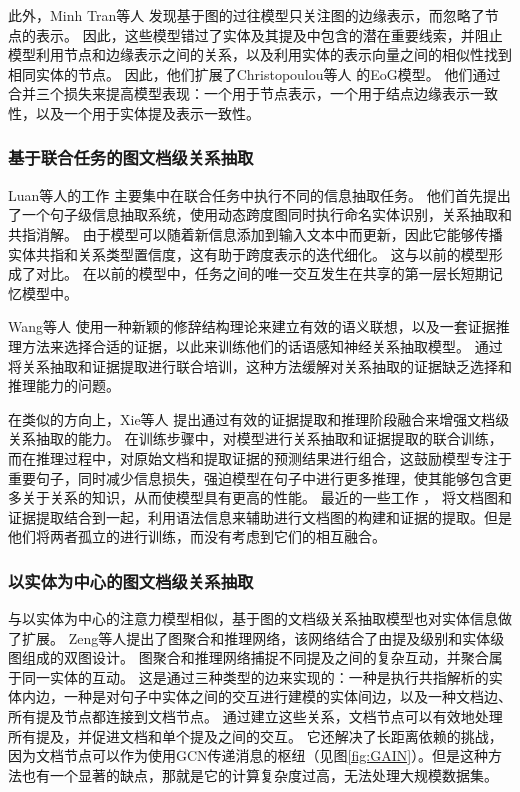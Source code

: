 \documentclass[bachelor]{thesis-uestc}
\begin{document}
此外，Minh Tran等人 \cite{minh-tran-etal-2020-dots}发现基于图的过往模型只关注图的边缘表示，而忽略了节点的表示。
因此，这些模型错过了实体及其提及中包含的潜在重要线索，并阻止模型利用节点和边缘表示之间的关系，以及利用实体的表示向量之间的相似性找到相同实体的节点。
因此，他们扩展了Christopoulou等人 \cite{christopoulou-etal-2019-connecting}的EoG模型。
他们通过合并三个损失来提高模型表现：一个用于节点表示，一个用于结点边缘表示一致性，以及一个用于实体提及表示一致性。\par

\subsubsection{基于联合任务的图文档级关系抽取}\label{subsec:joined-graph}

Luan等人的工作 \cite{luan-etal-2019-general}主要集中在联合任务中执行不同的信息抽取任务。
他们首先提出了一个句子级信息抽取系统，使用动态跨度图同时执行命名实体识别，关系抽取和共指消解。
由于模型可以随着新信息添加到输入文本中而更新，因此它能够传播实体共指和关系类型置信度，这有助于跨度表示的迭代细化。
这与以前的模型形成了对比。
在以前的模型中，任务之间的唯一交互发生在共享的第一层长短期记忆模型中。\par

Wang等人 \cite{WANG2021107274}使用一种新颖的修辞结构理论来建立有效的语义联想，以及一套证据推理方法来选择合适的证据，以此来训练他们的话语感知神经关系抽取模型。
通过将关系抽取和证据提取进行联合培训，这种方法缓解对关系抽取的证据缺乏选择和推理能力的问题。\par

在类似的方向上，Xie等人 \cite{xie2022eider}提出通过有效的证据提取和推理阶段融合来增强文档级关系抽取的能力。
在训练步骤中，对模型进行关系抽取和证据提取的联合训练，而在推理过程中，对原始文档和提取证据的预测结果进行组合，这鼓励模型专注于重要句子，同时减少信息损失，强迫模型在句子中进行更多推理，使其能够包含更多关于关系的知识，从而使模型具有更高的性能。
最近的一些工作 \cite{SagDRE, duan-etal-2022-just}， 将文档图和证据提取结合到一起，利用语法信息来辅助进行文档图的构建和证据的提取。但是他们将两者孤立的进行训练，而没有考虑到它们的相互融合。
\par

\subsubsection{以实体为中心的图文档级关系抽取}\label{subsec:entity-centric-graph}

与以实体为中心的注意力模型相似，基于图的文档级关系抽取模型也对实体信息做了扩展。
Zeng等人\cite{GAIN}提出了图聚合和推理网络，该网络结合了由提及级别和实体级图组成的双图设计。
图聚合和推理网络捕捉不同提及之间的复杂互动，并聚合属于同一实体的互动。
这是通过三种类型的边来实现的：一种是执行共指解析的实体内边，一种是对句子中实体之间的交互进行建模的实体间边，以及一种文档边、所有提及节点都连接到文档节点。
通过建立这些关系，文档节点可以有效地处理所有提及，并促进文档和单个提及之间的交互。
它还解决了长距离依赖的挑战，因为文档节点可以作为使用GCN传递消息的枢纽（见图\ref{fig:GAIN}）。但是这种方法也有一个显著的缺点，那就是它的计算复杂度过高，无法处理大规模数据集。\par
\end{document}
